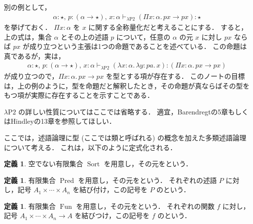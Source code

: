 \documentclass[./main]{subfiles}
\newcommand{\lam}{\lambda}
\newcommand{\bto}{\mathbin{\to}}
\newcommand{\ocl}{\mathord{:}}
\newcommand{\op}[1]{\mathop{\mathrm{#1}}\nolimits}
\newcommand{\typstar}{\mathord{\star}}
\newcommand{\textem}[1]{\textbf{\textgt{#1}}}
\newcommand{\fl}[1]{}
\newcommand{\fcdots}{\mathord{\cdots}}
\newcommand{\ats}{\,}
\theoremstyle{definition}
\newtheorem{defi}[theo]{定義}
\begin{document}
別の例として，
\begin{gather*}
\alpha \ocl\, \typstar,\ats p \ocl\, (\alpha \bto \typstar),\ats x \ocl\, \alpha \vdash _{\lam \mathrm{P2}} (\Pi x \ocl\, \alpha.\, px \bto px) \ocl\, \typstar
\end{gather*}
を挙げておく．
$ \Pi x \ocl\, \alpha $ を $ x $ に関する全称量化だと考えることにする．
すると，上の式は，集合 $ \alpha $ とその上の述語 $ p $ について，任意の $ \alpha $ の元 $ x $ に対し $ px $ ならば $ px $ が成り立つという主張は1つの命題であることを述べている．
この命題は真であるが，実は，
\begin{gather*}
\alpha \ocl\, \typstar,\ats p \ocl\, (\alpha \bto \typstar),\ats x \ocl\, \alpha \vdash _{\lam \mathrm{P2}} (\lam x \ocl\, \alpha.\, \lam y \ocl\, pa.\, x) \ocl\, (\Pi x \ocl\, \alpha.\, px \bto px)
\end{gather*}
が成り立つので，$ \Pi x \ocl\, \alpha.\, px \bto px $ を型とする項が存在する．
このノートの目標は，上の例のように，型を命題だと解釈したとき，その命題が真ならばその型をもつ項が実際に存在することを示すことである．

$ \lam \mathrm{P2} $ の詳しい性質についてはここでは省略する．
適宜，Barendregt\cite{blct}の5章もしくはHindley\cite{jrh}の13章を参照してほしい．


ここでは，述語論理に型 (ここでは類と呼ばれる) の概念を加えた多類述語論理について考える．
これは，以下のように定式化される．

\begin{defi}
空でない有限集合 $ \op{Sort} $ を用意し，その元を\textem{類\fl{sort}}という．
\end{defi}

\begin{defi}
有限集合 $ \op{Pred} $ を用意し，その元を\textem{述語\fl{predicate}}という．
それぞれの述語 $ P $ に対し，記号 $ A _1 \times \fcdots \times A _n $ を結び付け，この記号を $ P $ の\textem{アリティ\fl{arity}}という．
\end{defi}

\begin{defi}
有限集合 $ \op{Fun} $ を用意し，その元を\textem{関数\fl{function}}という．
それぞれの関数 $ f $ に対し，記号 $ A _1 \times \fcdots \times A _n \to A $ を結びつけ，この記号を $ f $ の\textem{アリティ\fl{arity}}という．
\end{defi}
\end{document}
